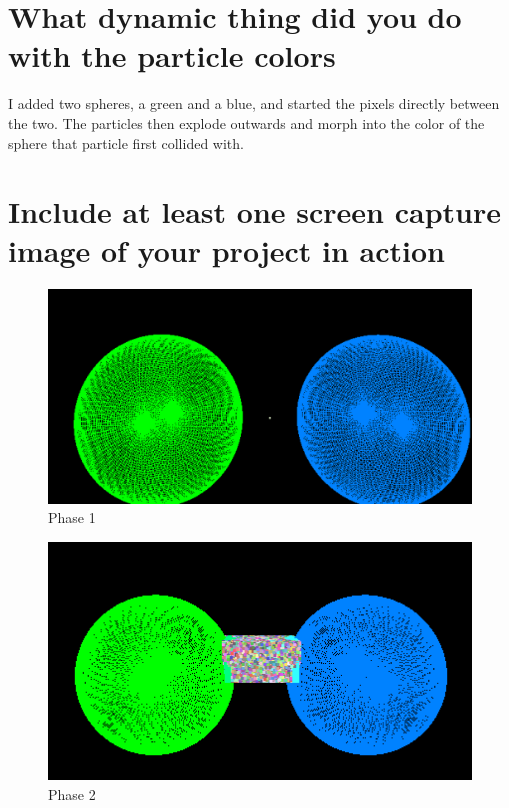 \documentclass[onecolumn,draftclsnofoot, 10pt, compsoc]{IEEEtran}
\begin{document}
\section{What dynamic thing did you do with the particle colors}
	I added two spheres, a green and a blue, and started the pixels directly between the two. The particles then explode outwards and morph into the color of the sphere that particle first collided with.



\section{Include at least one screen capture image of your project in action}
	
	\begin{figure}[H]
		\includegraphics[width=14cm]{pic1}
		\caption{Phase 1}
	\end{figure}
	\begin{figure}[H]
		\includegraphics[width=14cm]{pic2}
		\caption{Phase 2}
	\end{figure}
\end{document}
